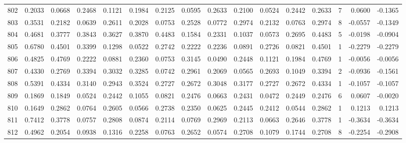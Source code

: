 \begin{tabular}{lrrrrrrrrrrrrrrr}
802 &      0.2033 &  0.0668 &  0.2468 &  0.1121 &  0.1984 &  0.2125 &  0.0595 &  0.2633 &  0.2100 &  0.0524 &   0.2442 &     0.2633 &      7 &                    0.0600 &                    -0.1365 \\
803 &      0.3531 &  0.2182 &  0.0639 &  0.2611 &  0.2028 &  0.0753 &  0.2528 &  0.0772 &  0.2974 &  0.2132 &   0.0763 &     0.2974 &      8 &                   -0.0557 &                    -0.1349 \\
804 &      0.4681 &  0.3777 &  0.3843 &  0.3627 &  0.3870 &  0.4483 &  0.1584 &  0.2331 &  0.1037 &  0.0573 &   0.2695 &     0.4483 &      5 &                   -0.0198 &                    -0.0904 \\
805 &      0.6780 &  0.4501 &  0.3399 &  0.1298 &  0.0522 &  0.2742 &  0.2222 &  0.2236 &  0.0891 &  0.2726 &   0.0821 &     0.4501 &      1 &                   -0.2279 &                    -0.2279 \\
806 &      0.4825 &  0.4769 &  0.2222 &  0.0881 &  0.2360 &  0.0753 &  0.3145 &  0.0490 &  0.2448 &  0.1121 &   0.1984 &     0.4769 &      1 &                   -0.0056 &                    -0.0056 \\
807 &      0.4330 &  0.2769 &  0.3394 &  0.3032 &  0.3285 &  0.0742 &  0.2961 &  0.2069 &  0.0565 &  0.2693 &   0.1049 &     0.3394 &      2 &                   -0.0936 &                    -0.1561 \\
808 &      0.5391 &  0.4334 &  0.3140 &  0.2943 &  0.3524 &  0.2727 &  0.2672 &  0.3048 &  0.3177 &  0.2727 &   0.2672 &     0.4334 &      1 &                   -0.1057 &                    -0.1057 \\
809 &      0.1869 &  0.1849 &  0.0524 &  0.2442 &  0.1055 &  0.0821 &  0.2476 &  0.0663 &  0.2431 &  0.0472 &   0.2449 &     0.2476 &      6 &                    0.0607 &                    -0.0020 \\
810 &      0.1649 &  0.2862 &  0.0764 &  0.2605 &  0.0566 &  0.2738 &  0.2350 &  0.0625 &  0.2445 &  0.2412 &   0.0544 &     0.2862 &      1 &                    0.1213 &                     0.1213 \\
811 &      0.7412 &  0.3778 &  0.0757 &  0.2808 &  0.0874 &  0.2114 &  0.0769 &  0.2969 &  0.2113 &  0.0663 &   0.2646 &     0.3778 &      1 &                   -0.3634 &                    -0.3634 \\
812 &      0.4962 &  0.2054 &  0.0938 &  0.1316 &  0.2258 &  0.0763 &  0.2652 &  0.0574 &  0.2708 &  0.1079 &   0.1744 &     0.2708 &      8 &                   -0.2254 &                    -0.2908 \\

\end{tabular}
